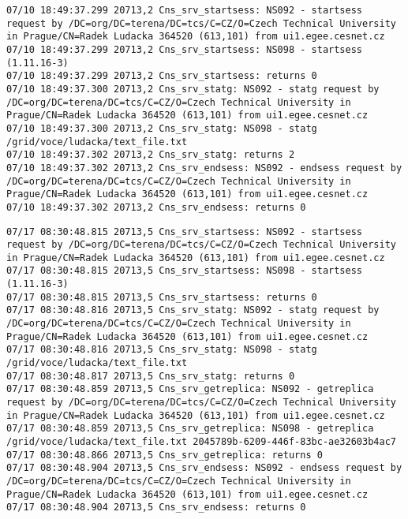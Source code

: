 \documentclass[a4paper, 11pt]{article} %
\begin{document}
\begin{lstlisting}[label={log:rep2},caption={lcg-rep --vo voce -d darkmass.wcss.wroc.pl lfn:/grid/voce/ludacka/text\_file.txt - replicate file that does not exist}]
07/10 18:49:37.299 20713,2 Cns_srv_startsess: NS092 - startsess request by /DC=org/DC=terena/DC=tcs/C=CZ/O=Czech Technical University in Prague/CN=Radek Ludacka 364520 (613,101) from ui1.egee.cesnet.cz
07/10 18:49:37.299 20713,2 Cns_srv_startsess: NS098 - startsess (1.11.16-3)
07/10 18:49:37.299 20713,2 Cns_srv_startsess: returns 0
07/10 18:49:37.300 20713,2 Cns_srv_statg: NS092 - statg request by /DC=org/DC=terena/DC=tcs/C=CZ/O=Czech Technical University in Prague/CN=Radek Ludacka 364520 (613,101) from ui1.egee.cesnet.cz
07/10 18:49:37.300 20713,2 Cns_srv_statg: NS098 - statg /grid/voce/ludacka/text_file.txt 
07/10 18:49:37.302 20713,2 Cns_srv_statg: returns 2
07/10 18:49:37.302 20713,2 Cns_srv_endsess: NS092 - endsess request by /DC=org/DC=terena/DC=tcs/C=CZ/O=Czech Technical University in Prague/CN=Radek Ludacka 364520 (613,101) from ui1.egee.cesnet.cz
07/10 18:49:37.302 20713,2 Cns_srv_endsess: returns 0
\end{lstlisting}

\begin{lstlisting}[label={log:rep3},caption={lcg-rep --vo voce -d some.notexist.site lfn:/grid/voce/ludacka/text\_file.txt - replicate to site that does not exist}]
07/17 08:30:48.815 20713,5 Cns_srv_startsess: NS092 - startsess request by /DC=org/DC=terena/DC=tcs/C=CZ/O=Czech Technical University in Prague/CN=Radek Ludacka 364520 (613,101) from ui1.egee.cesnet.cz
07/17 08:30:48.815 20713,5 Cns_srv_startsess: NS098 - startsess (1.11.16-3)
07/17 08:30:48.815 20713,5 Cns_srv_startsess: returns 0
07/17 08:30:48.816 20713,5 Cns_srv_statg: NS092 - statg request by /DC=org/DC=terena/DC=tcs/C=CZ/O=Czech Technical University in Prague/CN=Radek Ludacka 364520 (613,101) from ui1.egee.cesnet.cz
07/17 08:30:48.816 20713,5 Cns_srv_statg: NS098 - statg /grid/voce/ludacka/text_file.txt 
07/17 08:30:48.817 20713,5 Cns_srv_statg: returns 0
07/17 08:30:48.859 20713,5 Cns_srv_getreplica: NS092 - getreplica request by /DC=org/DC=terena/DC=tcs/C=CZ/O=Czech Technical University in Prague/CN=Radek Ludacka 364520 (613,101) from ui1.egee.cesnet.cz
07/17 08:30:48.859 20713,5 Cns_srv_getreplica: NS098 - getreplica /grid/voce/ludacka/text_file.txt 2045789b-6209-446f-83bc-ae32603b4ac7
07/17 08:30:48.866 20713,5 Cns_srv_getreplica: returns 0
07/17 08:30:48.904 20713,5 Cns_srv_endsess: NS092 - endsess request by /DC=org/DC=terena/DC=tcs/C=CZ/O=Czech Technical University in Prague/CN=Radek Ludacka 364520 (613,101) from ui1.egee.cesnet.cz
07/17 08:30:48.904 20713,5 Cns_srv_endsess: returns 0
\end{lstlisting}
\end{document}
